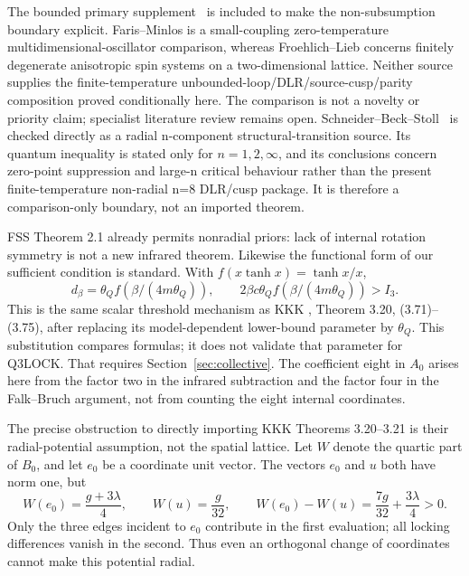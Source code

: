 \documentclass[11pt]{article}
\numberwithin{equation}{section}
\theoremstyle{definition}
\begin{document}
The bounded primary supplement~\cite{Faris-Minlos,Frohlich-Lieb} is included to
make the non-subsumption boundary explicit. Faris--Minlos is a small-coupling
zero-temperature multidimensional-oscillator comparison, whereas
Froehlich--Lieb concerns finitely degenerate anisotropic spin systems on a
two-dimensional lattice. Neither source supplies the finite-temperature
unbounded-loop/DLR/source-cusp/parity composition proved conditionally here.
The comparison is not a novelty or priority claim; specialist literature
review remains open. Schneider--Beck--Stoll~\cite{Schneider-Beck-Stoll} is
checked directly as a radial n-component structural-transition source. Its
quantum inequality is stated only for $n=1,2,\infty$, and its conclusions concern
zero-point suppression and large-n critical behaviour rather than the present
finite-temperature non-radial n=8 DLR/cusp package. It is therefore a
comparison-only boundary, not an imported theorem.

FSS Theorem 2.1 already permits nonradial priors: lack of internal rotation
symmetry is not a new infrared theorem. Likewise the functional form of our
sufficient condition is standard. With $f(x\tanh x)=\tanh x/x$,
\begin{equation}
 d_\beta=\theta_Q f(\beta/(4m\theta_Q)),\qquad
 2\beta c\theta_Q f(\beta/(4m\theta_Q))>I_3.
 \label{eq:standard-threshold-comparison}
\end{equation}
This is the same scalar threshold mechanism as KKK \cite{KKK},
Theorem 3.20, (3.71)--(3.75), after replacing its model-dependent
lower-bound parameter by $\theta_Q$. This substitution compares formulas;
it does not validate that parameter for Q3LOCK. That requires
Section~\ref{sec:collective}.
The coefficient eight in $A_0$ arises here from the factor two in the
infrared subtraction and the factor four in the Falk--Bruch argument,
not from counting the eight internal coordinates.

The precise obstruction to directly importing KKK Theorems 3.20--3.21 is
their radial-potential assumption, not the spatial lattice. Let $W$ denote
the quartic part of $B_0$, and let $e_0$ be a coordinate unit vector.
The vectors $e_0$ and $u$ both have norm one, but
\begin{equation}
 W(e_0)=\frac{g+3\lambda}{4},\qquad W(u)=\frac g{32},\qquad
 W(e_0)-W(u)=\frac{7g}{32}+\frac{3\lambda}{4}>0.
 \label{eq:nonradial-witness}
\end{equation}
Only the three edges incident to $e_0$ contribute in the first evaluation;
all locking differences vanish in the second. Thus even an orthogonal
change of coordinates cannot make this potential radial.
\end{document}
